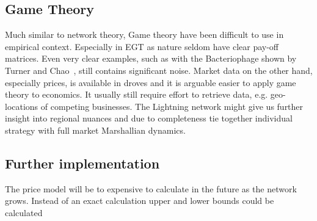 \subsection{Game Theory}

Much similar to network theory, Game theory have been difficult to use in empirical context. Especially in EGT as nature seldom have clear pay-off matrices. Even very clear examples, such as with the Bacteriophage shown by Turner and Chao~\cite{turner:chao:prisoners:dilemma, nowak:sigmund:phage}, still contains significant noise. Market data on the other hand, especially prices, is available in droves and it is arguable easier to apply game theory to economics. It usually still require effort to retrieve data, e.g. geo-locations of competing businesses. The Lightning network might give us further insight into regional nuances and due to completeness tie together individual strategy with full market Marshallian dynamics.    

\subsection{Further implementation}

The price model will be to expensive to calculate in the future as the network grows. Instead of an exact calculation upper and lower bounds could be calculated 




